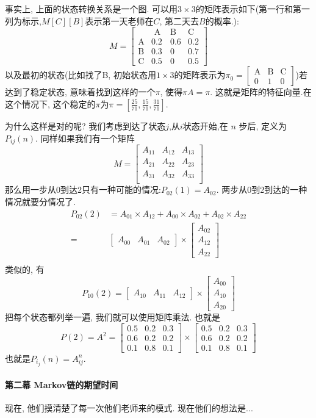     事实上, 上面的状态转换关系是一个图. 可以用$3\times 3$的矩阵表示如下(第一行和第一列为标示,$M[C][B]$表示第一天老师在$C$, 第二天去$B$的概率.):   
    $$
M=\left[\begin{array}{cccc}
&\text { A } & \text {B} & \text {C} \\
\text{A}&0.2 & 0.6 & 0.2 \\
\text{B}&0.3 & 0 & 0.7 \\
\text{C}& 0.5 & 0 & 0.5
\end{array}\right]
$$以及最初的状态(比如找了B, 初始状态用$1\times 3$的矩阵表示为$
\pi_0=\left[\begin{array}{ccc}
\text{A} & \text{B} & \text {C} \\
0 & 1 & 0
\end{array}\right]
$)若达到了稳定状态, 意味着找到这样的一个$\pi$, 使得$\pi A=\pi$. 这就是矩阵的特征向量.在这个情况下, 这个稳定的$\pi$为$\pi=\left[\frac{25}{71}, \frac{15}{71}, \frac{31}{71}\right]$.

为什么这样是对的呢? 我们考虑到达了状态$j$,从$i$状态开始,在 $n$ 步后, 定义为$P_{ij}(n)$. 同样如果我们有一个矩阵$$
M=\left[\begin{array}{ccc}
A_{11} & A_{12} & A_{13} \\ 
A_{21} & A_{22} & A_{23} \\ 
A_{31} & A_{32} & A_{33} \\ 
\end{array}\right]
$$
那么用一步从0到达2只有一种可能的情况:$P_{02}(1)=A_{02}$.  两步从0到2到达的一种情况就要分情况了. 
$$
\begin{aligned}
 P_{02}(2)&=A_{01} \times A_{12}+A_{00} \times A_{02}+A_{02} \times A_{22} \\
=& \left[\begin{array}{lll}
A_{00} & A_{01} & A_{02}
\end{array}\right] \times\left[\begin{array}{l}
A_{02} \\
A_{12} \\
A_{22}
\end{array}\right] \\
&
\end{aligned}
$$
类似的, 有$$
P_{10}(2)=\left[\begin{array}{lll}
A_{10} & A_{11} & A_{12}
\end{array}\right] \times\left[\begin{array}{c}
A_{00} \\
A_{10} \\
A_{20}
\end{array}\right]
$$
把每个状态都列举一遍, 我们就可以使用矩阵乘法. 也就是$$
P(2)=A^2=\left[\begin{array}{ccc}
0.5 & 0.2 & 0.3 \\
0.6 & 0.2 & 0.2 \\
0.1 & 0.8 & 0.1
\end{array}\right] \times\left[\begin{array}{ccc}
0.5 & 0.2 & 0.3 \\
0.6 & 0.2 & 0.2 \\
0.1 & 0.8 & 0.1
\end{array}\right]
$$也就是$P_{i_j}(n)=A_{i j}^n$. 

\paragraph{第二幕 Markov链的期望时间} 现在, 他们摸清楚了每一次他们老师来的模式. 
现在他们的想法是...